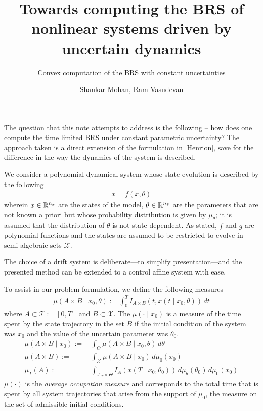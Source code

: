 \documentclass[10pt]{scrartcl}
\theoremstyle{remark}
\providecommand{\R}{\ensuremath \mathbb{R}}
\begin{document}
\title{Towards computing the BRS of nonlinear systems driven by uncertain dynamics}
\subtitle{Convex computation of the BRS with constant uncertainties}
\author{Shankar Mohan, Ram Vasudevan}
\maketitle
The question that this note attempts to address is the following -- how does one compute the time limited BRS under constant parametric uncertainty? The approach taken is a direct extension of the formulation in [Henrion], save for the difference in the way the dynamics of the system is described.\par
We consider a polynomial dynamical system whose state evolution is described by the following
\begin{align}
	\dot x=f(x,\theta)
\end{align}
wherein $x\in \R^{n_x}$ are the states of the model, $\theta\in \R^{n_\theta}$ are the parameters that are not known a priori but whose probability distribution is given by $\mu_{\theta}$; it is assumed that the distribution of $\theta$ is not state dependent. As stated, $f$ and $g$ are polynomial functions and the states are assumed to be restricted to evolve in semi-algebraic sets $\mathcal X$.
\par
The choice of a drift system is deliberate---to simplify presentation---and the presented method can be extended to a control affine system with ease.
\par 
To assist in our problem formulation, we define the following measures
\begin{align}
	\mu(A\times B\mid x_0,\theta):=\int_{0}^T I_{A\times B}(t,x(t\mid x_0,\theta)) \,dt
\end{align}
where $A\subset \mathcal T:=[0,T]$ and $B\subset \mathcal X$. The $\mu(\cdot\mid x_0)$ is a measure of the time spent by the state trajectory in the set $B$ if the initial condition of the system was $x_0$ and the value of the uncertain parameter was $\theta_0$.
\begin{align}
	\mu(A\times B\mid x_0):=&\,\int_{\Theta} \mu(A\times B\mid x_0,\theta) \,d\theta\\
	\mu(A\times B):=&\,\int_{\mathcal X} \mu(A\times B\mid x_0) \,d\mu_0(x_0)\\
	\mu_T(A):=&\,\int_{\mathcal X_T\times \Theta}I_{A}(x(T\mid x_0,\theta_0))\,d\mu_\theta(\theta_0)\,d\mu_0(x_0)
\end{align}
$\mu(\cdot)$ is the \emph{average occupation measure} and corresponds to the total time that is spent by all system trajectories that arise from the support of $\mu_0$, the measure on the set of admissible initial conditions.
\end{document}
